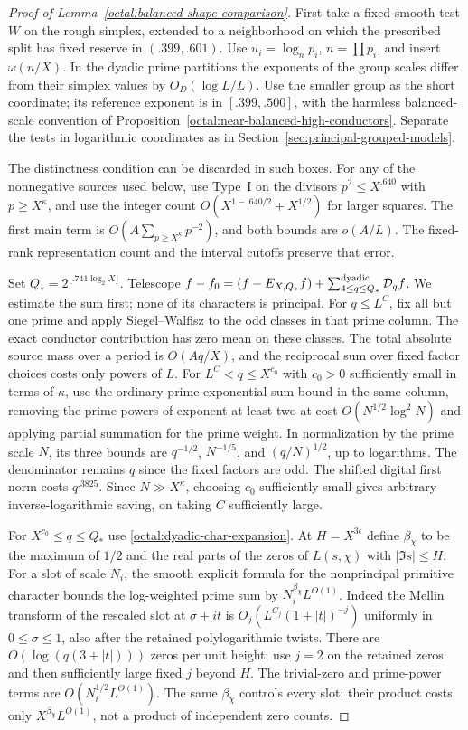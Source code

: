 \documentclass[11pt,a4paper]{article}
\theoremstyle{paperplain}
\numberwithin{equation}{section}
\begin{document}
\begin{proof}[Proof of Lemma~\ref{octal:balanced-shape-comparison}]
First take a fixed smooth test $W$ on the rough simplex, extended
to a neighborhood on which the prescribed split has fixed reserve in
$(.399,.601)$. Use $u_i=\log_n p_i$, $n=\prod p_i$, and insert
$\omega(n/X)$. In the dyadic prime partitions the exponents of the
group scales differ from their simplex values by $O_D(\log L/L)$.
Use the smaller group as the short coordinate; its reference exponent
is in $[.399,.500]$, with the harmless balanced-scale convention of
Proposition~\ref{octal:near-balanced-high-conductors}. Separate the
tests in logarithmic coordinates as in Section~\ref{sec:principal-grouped-models}.

The distinctness condition can be discarded in such boxes. For
any of the nonnegative sources used below, use Type~I on the
divisors $p^2\le X^{.640}$ with $p\ge X^\kappa$, and use the
integer count $O(X^{1-.640/2}+X^{1/2})$ for larger squares.
The first main term is $O(A\sum_{p\ge X^\kappa}p^{-2})$, and
both bounds are $o(A/L)$. The fixed-rank representation count
and the interval cutoffs preserve that error.

Set $Q_*=2^{\lfloor .741\log_2 X\rfloor}$. Telescope
$f-f_0=(f-E_{X,Q_*}f)+\sum_{4\le q\le Q_*}^{\rm dyadic}\mathcal D_q f$.
We estimate the sum first; none of its characters is principal. For $q\le L^C$, fix all but one
prime and apply Siegel--Walfisz to the odd classes in that prime
column. The exact conductor contribution has zero mean on these
classes. The total absolute source mass over a period is
$O(Aq/X)$, and the reciprocal sum over fixed factor choices costs
only powers of $L$. For $L^C<q\le X^{c_0}$ with $c_0>0$ sufficiently
small in terms of $\kappa$, use the ordinary prime exponential
sum bound \cite[Theorem~23.8]{Koukoulopoulos2019} in the same column, removing the prime powers of exponent at least two at cost $O(N^{1/2}\log^2 N)$ and applying partial summation for the prime weight. In normalization
by the prime scale $N$, its three bounds are $q^{-1/2}$, $N^{-1/5}$, and
$(q/N)^{1/2}$, up to logarithms. The denominator remains $q$ since the
fixed factors are odd. The shifted digital first norm costs $q^{.3825}$.
Since $N\gg X^\kappa$, choosing $c_0$ sufficiently small gives arbitrary
inverse-logarithmic saving, on taking $C$ sufficiently large.

For $X^{c_0}\le q\le Q_*$ use \eqref{octal:dyadic-char-expansion}.
At $H=X^{3\epsilon}$ define $\beta_\chi$ to be the maximum of $1/2$
and the real parts of the zeros of $L(s,\chi)$ with $|\Im s|\le H$.
For a slot of scale $N_i$, the smooth explicit formula for the
nonprincipal primitive character bounds the log-weighted prime sum
by $N_i^{\beta_\chi}L^{O(1)}$. Indeed the Mellin transform of the
rescaled slot at $\sigma+it$ is $O_j(L^{C_j}(1+|t|)^{-j})$ uniformly
in $0\le\sigma\le1$, also after the retained polylogarithmic twists.
There are $O(\log(q(3+|t|)))$ zeros per unit height; use $j=2$ on
the retained zeros and then sufficiently large fixed $j$ beyond $H$.
The trivial-zero and prime-power terms are $O(N_i^{1/2}L^{O(1)})$.
The same $\beta_\chi$ controls every slot: their product costs only
$X^{\beta_\chi}L^{O(1)}$, not a product of independent zero counts.


\end{proof}
\end{document}
